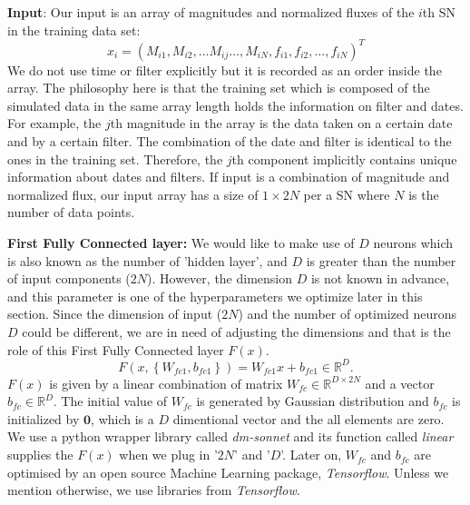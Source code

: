 \documentclass[useamsfonts]{pasj01}
\begin{document}
{\bf Input}: Our input is an array of magnitudes and normalized fluxes of the $i$th SN in the training data set:
\begin{equation}
      x_i = \left( M_{i1}, M_{i2}, \ldots M_{ij} \ldots , M_{iN}, f_{i1}, f_{i2}, \ldots, f_{iN} \right)^T
\end{equation}
We do not use time or filter explicitly but it is recorded as an order inside the array.  The philosophy here is that the training set which is composed of the simulated data in the same array length holds the information on filter and dates.  For example, the $j$th magnitude in the array is the data taken on a certain date and by a certain filter.  The combination of the date and filter is identical to the ones in the training set.  Therefore, the $j$th component implicitly contains unique information about dates and filters.  
If input is a combination of magnitude and normalized flux,
our input array has a size of $1\times2N$ per a SN where $N$ is the number of data points.


{\bf First Fully Connected layer:}
We would like to make use of $D$ neurons which is also known as the number of 'hidden layer', and $D$ is greater than the number of input components ($2N$).  However, the dimension $D$ is not known in advance, and this parameter is one of the hyperparameters we optimize later in this section.  Since the dimension of input ($2N$) and the number of optimized neurons $D$ could be different, we are in need of adjusting the dimensions and that is the role of this First Fully Connected layer $F(x)$.    
\begin{equation}
    F \left(x, \left\{W_{fc1},b_{fc1}\right\}\right) = W_{fc1} x + b_{fc1} \in \mathbb{R}^D.
\end{equation}
$F(x)$ is given by a linear combination of matrix $W_{fc} \in \mathbb{R}^{D\times 2N}$ and a vector $b_{fc} \in \mathbb{R}^D$. The initial value of $W_{fc}$ is generated by Gaussian distribution and $b_{fc}$ is initialized by $\mathbf{0}$, which is a $D$ dimentional vector and the all elements are zero.  We use a python wrapper library called {\it dm-sonnet} and its function called {\it linear} supplies the $F(x)$ when we plug in '$2N$' and '$D$'.  
Later on, $W_{fc}$ and $b_{fc}$ are optimised by an open source Machine Learning package, {\it Tensorflow}.  Unless we mention otherwise, we use libraries from {\it Tensorflow}.
\end{document}
